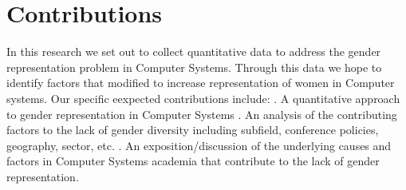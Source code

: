 \documentclass{sig-alternate-05-2015}
\begin{document}
\section{Contributions}
In this research we set out to collect quantitative data to address the gender representation problem in Computer Systems. Through this data we hope to identify factors that modified to increase representation of women in Computer systems. Our specific eexpected contributions include:
\newline
{}. A quantitative approach to gender representation in Computer Systems 
\newline
{}. An analysis of the contributing factors to the lack of gender diversity including subfield, conference policies, geography, sector, etc. 
\newline
{}. An exposition/discussion of the underlying causes and factors in Computer Systems academia that contribute to the lack of gender representation.  


%

%
%

\end{document}
